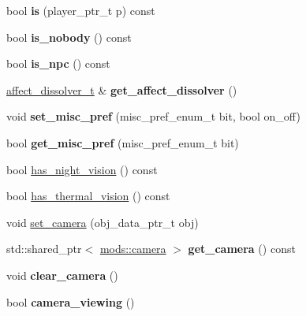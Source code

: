 \begin{DoxyCompactItemize}
bool {\bfseries is} (player\+\_\+ptr\+\_\+t p) const
\item 
\mbox{\label{classmods_1_1player_a854ea69ac76dee8f93e3c0b2b1e6512d}} 
bool {\bfseries is\+\_\+nobody} () const
\item 
\mbox{\label{classmods_1_1player_aba76379ca29fd4b79a99843106b2bc43}} 
bool {\bfseries is\+\_\+npc} () const
\item 
\mbox{\label{classmods_1_1player_a9f6a8b1a9339eadb2836d56700f743d7}} 
\hyperlink{structmods_1_1affects_1_1dissolver}{affect\+\_\+dissolver\+\_\+t} \& {\bfseries get\+\_\+affect\+\_\+dissolver} ()
\item 
\mbox{\label{classmods_1_1player_ac3f7da3737790ce82db3f97a35e175a6}} 
void {\bfseries set\+\_\+misc\+\_\+pref} (misc\+\_\+pref\+\_\+enum\+\_\+t bit, bool on\+\_\+off)
\item 
\mbox{\label{classmods_1_1player_ad8524b2a600811e694c4cc1892ee8451}} 
bool {\bfseries get\+\_\+misc\+\_\+pref} (misc\+\_\+pref\+\_\+enum\+\_\+t bit)
\item 
bool \hyperlink{classmods_1_1player_a9631c9d8b2bccdf598d84756fac2aeb9}{has\+\_\+night\+\_\+vision} () const
\item 
bool \hyperlink{classmods_1_1player_a0fceca22b6757b46d3b31c22acc3c690}{has\+\_\+thermal\+\_\+vision} () const
\item 
void \hyperlink{classmods_1_1player_aec46cbc02ebe8769c4c831510acafce3}{set\+\_\+camera} (obj\+\_\+data\+\_\+ptr\+\_\+t obj)
\item 
\mbox{\label{classmods_1_1player_a7b639adaff3e21cceec7b9ebf39b6e90}} 
std\+::shared\+\_\+ptr$<$ \hyperlink{classmods_1_1camera}{mods\+::camera} $>$ {\bfseries get\+\_\+camera} () const
\item 
\mbox{\label{classmods_1_1player_a22d85a409c50a67837d1e2faab1bf0bb}} 
void {\bfseries clear\+\_\+camera} ()
\item 
\mbox{\label{classmods_1_1player_af5c20d74a8a7d68ee0d63517145aa002}} 
bool {\bfseries camera\+\_\+viewing} ()
\item 

\end{DoxyCompactItemize}
